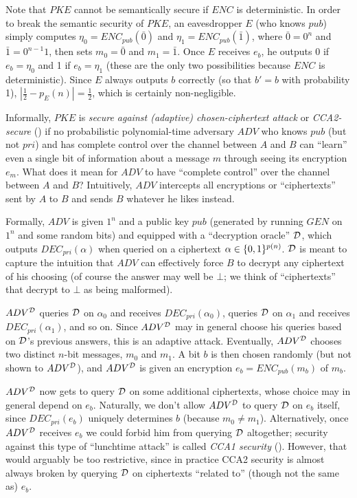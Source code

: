 Note that $PKE$ cannot be semantically secure if $ENC$ is deterministic. In
order to break the semantic security of $PKE$, an eavesdropper
$E$ (who knows $pub$) simply computes $\eta_0 = ENC_{pub}(\bar{0})$ and
$\eta_1 = ENC_{pub}(\bar{1})$, where $\bar{0} = 0^n$ and $\bar{1} = 0^{n-1}1$,
then sets $m_0 = \bar{0}$ and $m_1 = \bar{1}$.  Once $E$ receives $e_b$, he
outputs 0 if $e_b = \eta_0$ and 1 if $e_b = \eta_1$ (these are the only two
possibilities because $ENC$ is deterministic). Since $E$ always outputs $b$
correctly (so that $b' = b$ with probability 1), $|\frac{1}{2} - p_E(n)| =
\frac{1}{2}$, which is certainly non-negligible.
 
Informally, $PKE$ is {\it secure against (adaptive) chosen-ciphertext attack}
or {\it CCA2-secure} (\cite{rackoff:cca2}) if no probabilistic polynomial-time
adversary $ADV$ who knows $pub$ (but not $pri$) and has complete control over
the channel between $A$ and $B$ can ``learn'' even a single bit of information
about a message $m$ through seeing its encryption $e_m$. What does it mean for
$ADV$ to have ``complete control'' over the channel between $A$ and $B$?
Intuitively, $ADV$ intercepts all encryptions or ``ciphertexts'' sent by $A$
to $B$ and sends $B$ whatever he likes instead.

Formally, $ADV$ is given $1^n$ and a public key $pub$ (generated by running
$GEN$ on $1^n$ and some random bits) and equipped with a ``decryption oracle''
$\mathcal{D}$, which outputs $DEC_{pri}(\alpha)$ when queried on a ciphertext
$\alpha \in \{0,1\}^{p(n)}$.  $\mathcal{D}$ is meant to capture the intuition that
$ADV$ can effectively force $B$ to decrypt any ciphertext of his choosing (of
course the answer may well be $\bot$; we think of ``ciphertexts'' that decrypt
to $\bot$ as being malformed).

$ADV^{\mathcal{D}}$ queries $\mathcal{D}$ on $\alpha_0$ and receives $DEC_{pri}(\alpha_0)$,
queries $\mathcal{D}$ on $\alpha_1$ and receives $DEC_{pri}(\alpha_1)$, and so on.
Since $ADV^{\mathcal{D}}$ may in general choose his queries based on $\mathcal{D}$'s
previous answers, this is an adaptive attack.  Eventually, $ADV^{\mathcal{D}}$ chooses
two distinct $n$-bit messages, $m_0$ and $m_1$. A bit $b$ is then chosen
randomly (but not shown to $ADV^{\mathcal{D}}$), and $ADV^{\mathcal{D}}$ is given an
encryption $e_b = ENC_{pub}(m_b)$ of $m_b$. 

$ADV^{\mathcal{D}}$ now gets to query $\mathcal{D}$ on some additional ciphertexts, whose
choice may in general depend on $e_b$.  Naturally, we don't allow $ADV^{\mathcal{D}}$
to query $\mathcal{D}$ on $e_b$ itself, since $DEC_{pri}(e_b)$ uniquely determines
$b$ (because $m_0 \neq m_1$). Alternatively, once $ADV^{\mathcal{D}}$ receives $e_b$
we could forbid him from querying $\mathcal{D}$ altogether; security against this
type of ``lunchtime attack'' is called {\it CCA1 security} (\cite{naor:cca1}).
However, that would arguably be too restrictive, since in practice CCA2
security is almost always broken by querying $\mathcal{D}$ on ciphertexts ``related
to'' (though not the same as) $e_b$.

